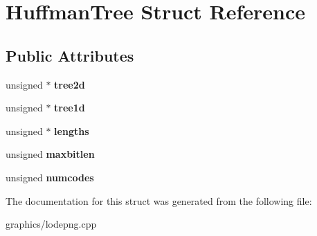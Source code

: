 \hypertarget{struct_huffman_tree}{\section{Huffman\+Tree Struct Reference}
\label{struct_huffman_tree}
}
\subsection*{Public Attributes}
\begin{DoxyCompactItemize}
\item 
\hypertarget{struct_huffman_tree_a91160304cb771d2f9f39ee357c9b05a8}{unsigned $\ast$ {\bfseries tree2d}}\label{struct_huffman_tree_a91160304cb771d2f9f39ee357c9b05a8}

\item 
\hypertarget{struct_huffman_tree_a47b3346a25fe0a3222b595c236ad146e}{unsigned $\ast$ {\bfseries tree1d}}\label{struct_huffman_tree_a47b3346a25fe0a3222b595c236ad146e}

\item 
\hypertarget{struct_huffman_tree_aef81d45a5c56276c5699a8e9a575021d}{unsigned $\ast$ {\bfseries lengths}}\label{struct_huffman_tree_aef81d45a5c56276c5699a8e9a575021d}

\item 
\hypertarget{struct_huffman_tree_adf034ca9ce62a4ebfffaaeaba4378a26}{unsigned {\bfseries maxbitlen}}\label{struct_huffman_tree_adf034ca9ce62a4ebfffaaeaba4378a26}

\item 
\hypertarget{struct_huffman_tree_a608df5a24f60d1077a5cde19d5149e1f}{unsigned {\bfseries numcodes}}\label{struct_huffman_tree_a608df5a24f60d1077a5cde19d5149e1f}

\end{DoxyCompactItemize}


The documentation for this struct was generated from the following file\+:\begin{DoxyCompactItemize}
\item 
graphics/lodepng.\+cpp\end{DoxyCompactItemize}
